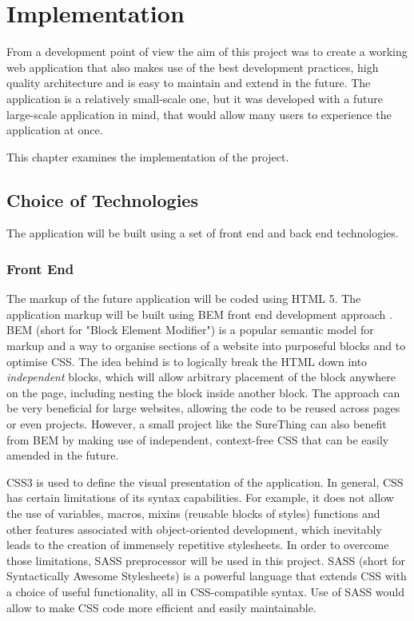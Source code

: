 \chapter{Implementation}\label{ch:Implementation}

From a development point of view the aim of this project was to create a working web application that also makes use of the best development practices, high quality architecture and is easy to maintain and extend in the future. The application is a relatively small-scale one, but it was developed with a future large-scale application in mind, that would allow many users to experience the application at once.

This chapter examines the implementation of the project.

\section{Choice of Technologies}
\label{sec:choiceoftechnologies}

	The application will be built using a set of front end and back end technologies.

\subsection{Front End}
	The markup of the future application will be coded using HTML 5\cite{html}. The application markup will be built using BEM front end development approach \cite{bem}. BEM (short for "Block Element Modifier") is a popular semantic model for markup and a way to organise sections of a website into purposeful blocks and to optimise CSS. The idea behind is to logically break the HTML down into \emph{independent} blocks, which will allow arbitrary placement of the block anywhere on the page, including nesting the block inside another block. The approach can be  very beneficial for large websites, allowing the code to be reused across pages or even projects. However, a small project like the SureThing can also benefit from BEM by making use of independent, context-free CSS that can be easily amended in the future\cite{bem_for_small_projects}.

	CSS3 is used to define the visual presentation of the application. In general, CSS has certain limitations of its syntax capabilities. For example, it does not allow the use of variables, macros, mixins (reusable blocks of styles) functions and other features associated with object-oriented development, which inevitably leads to the creation of immensely repetitive stylesheets. In order to overcome those limitations, SASS preprocessor \cite{sass} will be used in this project. SASS (short for Syntactically Awesome Stylesheets) is a powerful language that extends CSS with a choice of useful functionality, all in CSS-compatible syntax. Use of SASS would allow to make CSS code more efficient and easily maintainable. 

